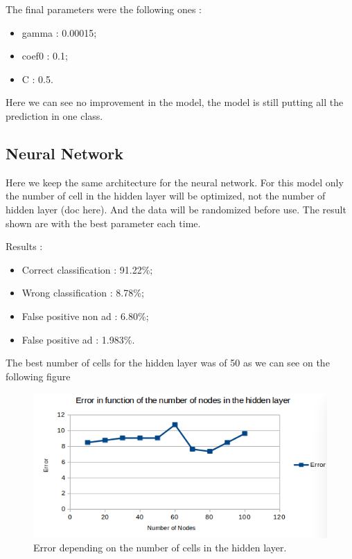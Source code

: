 The final parameters were the following ones :
\begin{itemize}
  \item gamma : 0.00015;
  \item coef0 : 0.1;
  \item C : 0.5.
\end{itemize}

Here we can see no improvement in the model, the model is still putting all the prediction in one class.

\subsection{Neural Network}

  Here we keep the same architecture for the neural network. For this model only the number of cell in the hidden layer will be optimized, not the number of hidden layer (doc here). And the data will be randomized before use. The result shown are with the best parameter each time.

  Results :
  \begin{itemize}
    \item Correct classification : 91.22\%;
    \item Wrong classification : 8.78\%;
    \item False positive non ad : 6.80\%;
    \item False positive ad : 1.983\%.
  \end{itemize}

  The best number of cells for the hidden layer was of 50 as we can see on the following figure

  \begin{figure}[h]
   \centering
   \includegraphics[scale=0.5]{../data/images/NNPO.png}
   \caption{Error depending on the number of cells in the hidden layer.}
  \end{figure}

